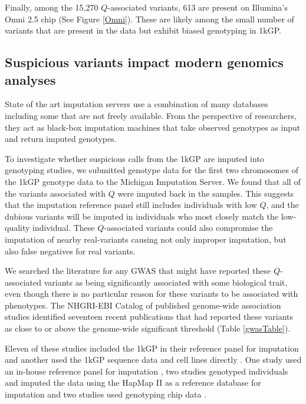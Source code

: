 \documentclass[9pt,lineno]{template}
\begin{document}
Finally, among the 15,270 $Q$-associated variants, 613 are present on Illumina's Omni 2.5 chip (See Figure \ref{Omni}). 
These are likely among the small number of variants that are present in the data but exhibit biased genotyping in 1kGP. 


\subsection{Suspicious variants impact modern genomics analyses}

State of the art imputation servers use a combination of many databases including some that are not freely available.
From the perspective of researchers, they act as black-box imputation machines that take observed genotypes as input and return imputed genotypes.  

To investigate whether suspicious calls from the 1kGP are imputed into genotyping studies, we submitted genotype data for the first two chromosomes of the 1kGP genotype data to the Michigan Imputation Server.
We found that all of the variants associated with $Q$ were imputed back in the samples.
This suggests that the imputation reference panel still includes individuals with low $Q$, and the dubious variants will be imputed in individuals who most closely match the low-quality individual.
These $Q$-associated variants could also compromise the imputation of nearby real-variants causing not only improper imputation, but also false negatives for real variants.

We searched the literature for any GWAS that might have reported these $Q$-associated variants as being significantly associated with some biological trait, even though there is no particular reason for these variants to be associated with phenotypes.
The NHGRI-EBI Catalog of published genome-wide association studies identified seventeen recent publications that had reported these variants as close to or above the genome-wide significant threshold (Table \ref{gwasTable}).

Eleven of these studies included the 1kGP in their reference panel for imputation \citep{xu2012genome, lutz2015genome, park2015mercapturic, astle2016allelic, herold2016family,  suhre2017connecting, lopez2017genome, tian2017genome,  spracklen2017association,  nagy2017exploration, gao2018genome} and another used the 1kGP sequence data and cell lines directly \citep{Mandage2017}.
One study used an in-house reference panel for imputation \citep{nishida2018key}, two studies genotyped individuals and imputed the data using the HapMap II as a reference  database for imputation \citep{Kraja2011, Ebejer2013} and two studies used genotyping chip data \citep{yucesoy2015genome, ellinghaus2016analysis}. 
\end{document}
